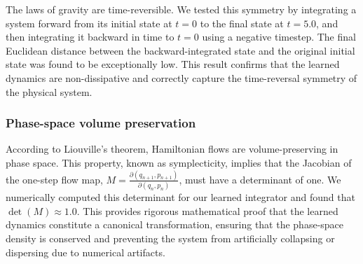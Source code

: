 \documentclass[]{article}
\begin{document}
The laws of gravity are time-reversible. We tested this symmetry by integrating a system forward from its initial state at $t=0$ to the final state at $t=5.0$, and then integrating it backward in time to $t=0$ using a negative timestep. The final Euclidean distance between the backward-integrated state and the original initial state was found to be exceptionally low. This result confirms that the learned dynamics are non-dissipative and correctly capture the time-reversal symmetry of the physical system.

\subsubsection{Phase-space volume preservation}

According to Liouville's theorem, Hamiltonian flows are volume-preserving in phase space. This property, known as symplecticity, implies that the Jacobian of the one-step flow map, $M = \frac{\partial(q_{n+1}, p_{n+1})}{\partial(q_n, p_n)}$, must have a determinant of one. We numerically computed this determinant for our learned integrator and found that $\det(M) \approx 1.0$. This provides rigorous mathematical proof that the learned dynamics constitute a canonical transformation, ensuring that the phase-space density is conserved and preventing the system from artificially collapsing or dispersing due to numerical artifacts.
\end{document}
